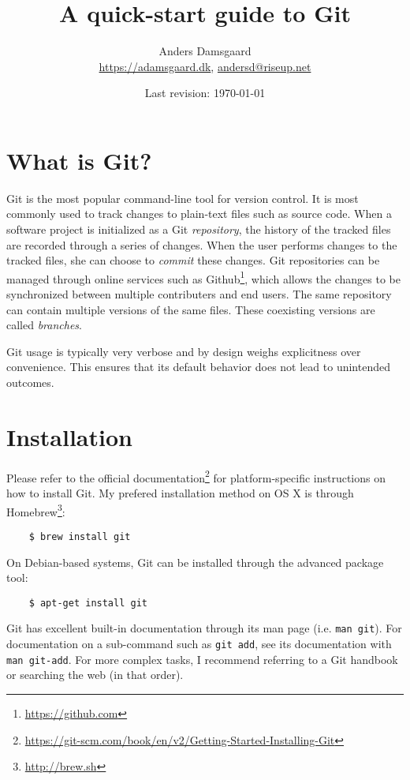 \documentclass[11pt]{article}
\begin{document}
\title{A quick-start guide to Git}

\author{Anders Damsgaard\\\url{https://adamsgaard.dk}, \url{andersd@riseup.net}}
\date{{\small Last revision: \today}}

\maketitle

\section{What is Git?}
Git is the most popular command-line tool for version control.  It is most 
commonly used to track changes to plain-text files such as source code.  When a 
software project is initialized as a Git \emph{repository}, the history of the 
tracked files are recorded through a series of changes.  When the user performs 
changes to the tracked files, she can choose to \emph{commit} these changes.  
Git repositories can be managed through online services such as 
Github\footnote{\url{https://github.com}}, which allows the changes to be 
synchronized between multiple contributers and end users.  The same repository 
can contain multiple versions of the same files.  These coexisting versions are 
called \emph{branches}.

Git usage is typically very verbose and by design weighs explicitness over 
convenience.  This ensures that its default behavior does not lead to unintended 
outcomes.

\section{Installation}
Please refer to the official documentation\footnote{%
\url{https://git-scm.com/book/en/v2/Getting-Started-Installing-Git}} for 
platform-specific instructions on how to install Git.
My prefered installation method on OS X is through 
Homebrew\footnote{\url{http://brew.sh}}:
\begin{lstlisting}
    $ brew install git
\end{lstlisting}
On Debian-based systems, Git can be installed through the advanced package tool:
\begin{lstlisting}
    $ apt-get install git
\end{lstlisting}

Git has excellent built-in documentation through its man page (i.e. \texttt{man 
    git}).  For documentation on a sub-command such as \texttt{git add}, see its 
documentation with \texttt{man git-add}. For more complex tasks, I recommend 
referring to a Git handbook or searching the web (in that order).
\end{document}
